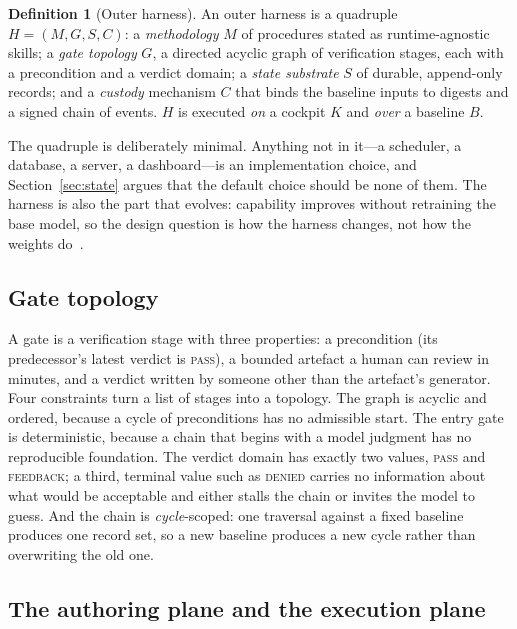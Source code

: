 \documentclass[10pt,a4paper]{article}
\theoremstyle{definition}
\newtheorem{definition}{Definition}[section]
\theoremstyle{plain}
\theoremstyle{principle}
\begin{document}
\begin{definition}[Outer harness]\label{def:harness}
An outer harness is a quadruple $H=(M,G,S,C)$: a \emph{methodology} $M$ of procedures stated as
runtime-agnostic skills; a \emph{gate topology} $G$, a directed acyclic graph of verification
stages, each with a precondition and a verdict domain; a \emph{state substrate} $S$ of durable,
append-only records; and a \emph{custody} mechanism $C$ that binds the baseline inputs to digests
and a signed chain of events. $H$ is executed \emph{on} a cockpit $K$ and \emph{over} a baseline
$B$.
\end{definition}

\noindent
The quadruple is deliberately minimal. Anything not in it---a scheduler, a database, a server, a
dashboard---is an implementation choice, and Section~\ref{sec:state} argues that the default
choice should be none of them. The harness is also the part that evolves: capability improves
without retraining the base model, so the design question is how the harness changes, not how the
weights do~\cite{lin2026}.

\subsection{Gate topology}

A gate is a verification stage with three properties: a precondition (its predecessor's latest
verdict is \textnormal{\textsc{pass}}), a bounded artefact a human can review in minutes, and a verdict written
by someone other than the artefact's generator. Four constraints turn a list of stages into a
topology. The graph is acyclic and ordered, because a cycle of preconditions has no admissible
start. The entry gate is deterministic, because a chain that begins with a model judgment has no
reproducible foundation. The verdict domain has exactly two values, \textnormal{\textsc{pass}} and
\textnormal{\textsc{feedback}}; a third, terminal value such as \textnormal{\textsc{denied}} carries no information about
what would be acceptable and either stalls the chain or invites the model to guess. And the chain
is \emph{cycle}-scoped: one traversal against a fixed baseline produces one record set, so a new
baseline produces a new cycle rather than overwriting the old one.

\subsection{The authoring plane and the execution plane}
\end{document}
